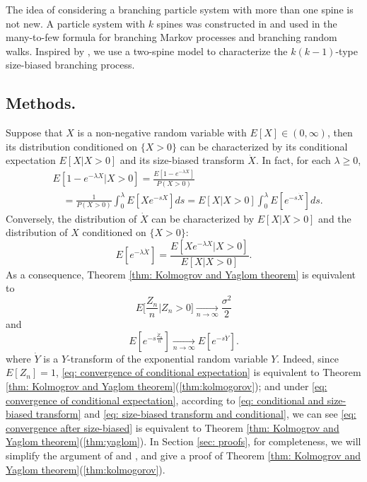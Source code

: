 \documentclass[12pt,a4paper]{amsart}
\numberwithin{equation}{section}
\begin{document}
	The idea of considering a branching particle system with more than one spine is not new.
	A particle system with $k$ spines  was constructed in \cite{harris2015many} and used in the  many-to-few formula for branching Markov processes and branching random walks.
	Inspired by \cite{harris2015many}, we use a two-spine model to characterize the $k(k-1)$-type size-biased branching process.


\subsection{Methods.}
\label{sec: Methods}
	Suppose that $X$ is a non-negative 
	random variable with $E[X] \in (0,\infty)$,
	then its distribution conditioned on $\{ X > 0\}$ can be characterized by its conditional expectation $E[X|X>0]$ and its size-biased transform $\dot X$.
	In fact, for each $\lambda \geq 0$,
\begin{equation}
\label{eq: conditional and size-biased transform}
\begin{split}
	&E[1-e^{-\lambda X}|X>0]
	= \frac{E[1-e^{-\lambda X}]}{P(X>0)}
	\\&\quad = \frac{1}{P(X>0)}\int_0^\lambda E[Xe^{-s X}]ds = E[X|X>0]\int_0^\lambda E[e^{-s \dot X}]ds.
\end{split}
\end{equation}
	Conversely, the distribution of $\dot X$ can be characterized by $E[X|X>0]$ and the distribution of $X$ conditioned on $\{ X > 0\}$: 
\[\label{eq: size-biased transform and conditional}
	E[e^{- \lambda \dot X}] 
	= \frac{E[Xe^{-\lambda X}| X>0]}{E[X| X>0]}.
\]
	As a consequence,  
	Theorem \ref{thm: Kolmogrov and Yaglom theorem}
	is equivalent to
\begin{equation}
\label{eq: convergence of conditional expectation}
	E\big[\frac{Z_n}{n}| Z_n > 0\big]
	\xrightarrow[n\to \infty]{} \frac{\sigma^2}{2}
\end{equation}
	and
\[
\label{eq: convergence after size-biased}
	E[e^{-s \frac{\dot Z_n}{n}}]
	\xrightarrow[n\to \infty]{} E[e^{-s \dot Y}].
\]
	where $\dot Y$ is a $Y$-transform 
	of the exponential random variable $Y$.
	Indeed, since $E[Z_n] = 1$, \eqref{eq: convergence of conditional expectation} is equivalent to Theorem \ref{thm: Kolmogrov and Yaglom theorem}(\ref{thm:kolmogorov}); and under \eqref{eq: convergence of conditional expectation}, according to \eqref{eq: conditional and size-biased transform} and \eqref{eq: size-biased transform and conditional}, we can see \eqref{eq: convergence after size-biased} is equivalent to Theorem \ref{thm: Kolmogrov and Yaglom theorem}(\ref{thm:yaglom}).
	In Section \ref{sec: proofs}, for completeness, we will simplify 
	the argument of \cite{geiger1999elementary} and \cite{VD},
	and give a proof of Theorem \ref{thm: Kolmogrov and Yaglom theorem}(\ref{thm:kolmogorov}).
\end{document}
